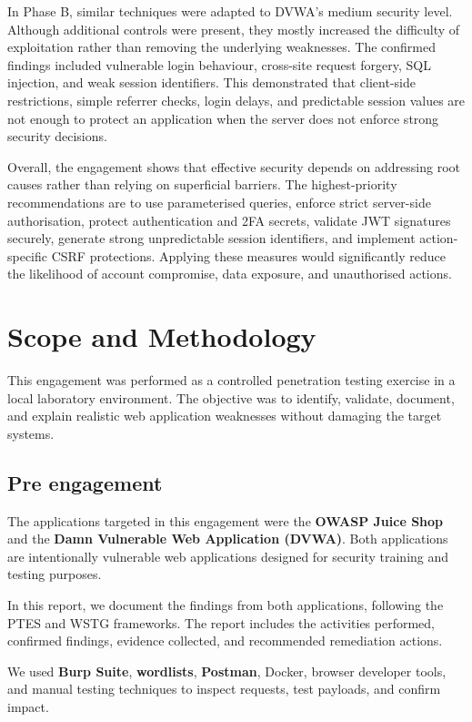 \documentclass[11pt,a4paper]{report}
\begin{document}
        In Phase B, similar techniques were adapted to DVWA's medium security level. Although additional controls were present, they mostly increased the difficulty of exploitation rather than removing the underlying weaknesses. The confirmed findings included vulnerable login behaviour, cross-site request forgery, SQL injection, and weak session identifiers. This demonstrated that client-side restrictions, simple referrer checks, login delays, and predictable session values are not enough to protect an application when the server does not enforce strong security decisions.

        Overall, the engagement shows that effective security depends on addressing root causes rather than relying on superficial barriers. The highest-priority recommendations are to use parameterised queries, enforce strict server-side authorisation, protect authentication and 2FA secrets, validate JWT signatures securely, generate strong unpredictable session identifiers, and implement action-specific CSRF protections. Applying these measures would significantly reduce the likelihood of account compromise, data exposure, and unauthorised actions.

    \chapter{Scope and Methodology}
        
        This engagement was performed as a controlled penetration testing exercise in a local laboratory environment. The objective was to identify, validate, document, and explain realistic web application weaknesses without damaging the target systems.
        
        \section{Pre engagement}

        The applications targeted in this engagement were the \textbf{OWASP Juice Shop} and the \textbf{Damn Vulnerable Web Application (DVWA)}. Both applications are intentionally vulnerable web applications designed for security training and testing purposes.

        In this report, we document the findings from both applications, following the PTES and WSTG frameworks. The report includes the activities performed, confirmed findings, evidence collected, and recommended remediation actions.

        We used \textbf{Burp Suite}, \textbf{wordlists}, \textbf{Postman}, Docker, browser developer tools, and manual testing techniques to inspect requests, test payloads, and confirm impact.
\end{document}
